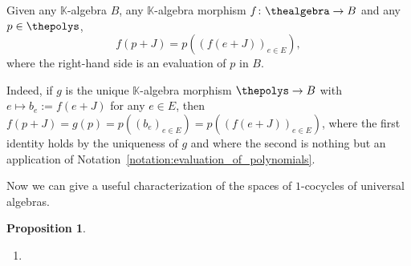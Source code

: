 \documentclass[10pt,a4paper]{amsart}
\numberwithin{equation}{section}
\newtheorem{Proposition}[Theorem]{Proposition}
{ \theoremstyle{definition}
\newtheorem{Definition}[Theorem]{Definition}
\newtheorem{Note}[Theorem]{Note}
\newtheorem{Example}[Theorem]{Example}
\newtheorem{Remark}[Theorem]{Remark}
\newtheorem{Notation}[Theorem]{Notation}
\newtheorem{Assumptions}[Theorem]{Assumptions}
}
\newcommand{\fromto}[2]{#1 \to #2}
\newcommand{\xfromto}[3]{#1 \colon  #2 \to #3}
\newcommand{\thegens}{E}
\newcommand{\theideal}{J}
\newcommand{\thefield}{\mathbb{K}}
\begin{document}
{\begin{Remark}
  \label{remark:evaluation_of_polynomials}
  \newcommand{\anyalgebra}{B}
  \newcommand{\anytuple}{b}
  \newcommand{\anygen}{e}
  \newcommand{\anytuplex}[1]{\anytuple_{#1}}
  \newcommand{\anypoly}{p}
  \newcommand{\themorph}{f}
  \newcommand{\bigmorph}{g}
  \newcommand{\theproj}{\pi}
  Given any $\thefield$-algebra $\anyalgebra$,  any $\thefield$-algebra morphism $\xfromto{\themorph}{\thealgebra}{\anyalgebra}$ and any $\anypoly\in\thepolys$,
  \[
    \themorph(\anypoly+\theideal)=\anypoly((\themorph(\anygen+\theideal))_{\anygen\in\thegens}),
  \]
  where  the right-hand side is an evaluation of $\anypoly$ in $\anyalgebra$.

  Indeed, if $\bigmorph$ is the unique $\thefield$-algebra morphism $\fromto{\thepolys}{\anyalgebra}$ with $\anygen\mapsto \anytuplex{\anygen}:= \themorph(\anygen+\theideal)$ for any $\anygen\in\thegens$, then $\themorph(\anypoly+\theideal)=\bigmorph(\anypoly)=\anypoly((\anytuplex{\anygen})_{\anygen\in\thegens})=\anypoly((\themorph(\anygen+\theideal))_{\anygen\in\thegens})$, where the first identity holds by the uniqueness of $\bigmorph$ and where the second is nothing but an application of Notation~\ref{notation:evaluation_of_polynomials}.
\end{Remark}
Now we can give a useful characterization of the spaces of $1$-cocycles of universal algebras.
{
    \newcommand{\somegen}{e}
    \newcommand{\somerel}{r}
    \newcommand{\somevector}{x}
    \newcommand{\anyvector}{z}
    \newcommand{\thetuple}{x}
    \newcommand{\thetuplex}[1]{x_{#1}}
    \newcommand{\somederivation}{\eta}
    \newcommand{\somepoly}{p}
    \begin{Proposition}\quad
      \label{proposition:hochschild-particular-one-cohomology}
      \begin{enumerate}
      \item      \label{proposition:hochschild-particular-one-cohomology-1}


\end{enumerate}
\end{Proposition}}}
\end{document}
